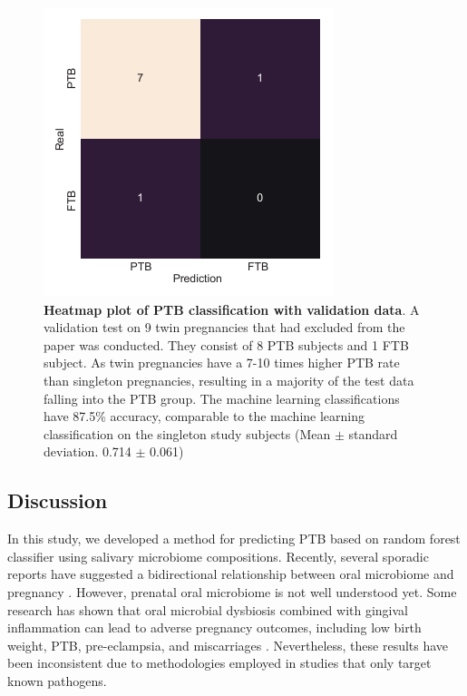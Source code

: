 \documentclass[11pt, a4paper, onecolumn, oneside]{report}
\begin{document}
            \begin{figure}[p]
                \centering
                \includegraphics[width=12 cm]{Figures/PTB/FigS3-validation}
                \caption[Heatmap plot of PTB classification with validation data]{\textbf{Heatmap plot of PTB classification with validation data}. A validation test on 9 twin pregnancies that had excluded from the paper was conducted. They consist of 8 PTB subjects and 1 FTB subject. As twin pregnancies have a 7-10 times higher PTB rate than singleton pregnancies, resulting in a majority of the test data falling into the PTB group. The machine learning classifications have 87.5\% accuracy, comparable to the machine learning classification on the singleton study subjects (Mean $\pm$ standard deviation. 0.714 $\pm$ 0.061)}
                \label{fig:PTB-validation}
            \end{figure}
            \clearpage
        \newpage

        \subsection{Discussion}
            In this study, we developed a method for predicting PTB based on random forest classifier using salivary microbiome compositions. Recently, several sporadic reports have suggested a bidirectional relationship between oral microbiome and pregnancy \cite{PTB-mechanism-3}. However, prenatal oral microbiome is not well understood yet. Some research has shown that oral microbial dysbiosis combined with gingival inflammation can lead to adverse pregnancy  outcomes, including low birth weight, PTB, pre-eclampsia, and miscarriages \cite{PTB-mechanism-6}. Nevertheless, these results have been inconsistent due to methodologies employed in studies that only target known pathogens.
\end{document}
